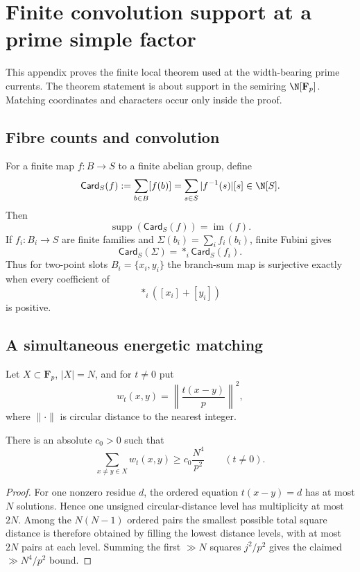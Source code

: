 \section{Finite convolution support at a prime simple factor}
\label{app:atomic-convolution}

This appendix proves the finite local theorem used at the width-bearing prime
currents.  The theorem statement is about support in the semiring
$\N[\mathbf F_p]$.  Matching coordinates and characters occur only inside the
proof.

\subsection{Fibre counts and convolution}

For a finite map $f:B\to S$ to a finite abelian group, define
\[
\mathsf{Card}_S(f)
:=\sum_{b\in B}[f(b)]
=\sum_{s\in S}|f^{-1}(s)|[s]
\in\N[S].
\]
Then
\[
\operatorname{supp}(\mathsf{Card}_S(f))=\operatorname{im}(f).
\tag{AC1}\label{eq:card-support}
\]
If $f_i:B_i\to S$ are finite families and
$\Sigma(b_i)=\sum_i f_i(b_i)$, finite Fubini gives
\[
\mathsf{Card}_S(\Sigma)=*_{i}\mathsf{Card}_S(f_i).
\tag{AC2}\label{eq:fubini-convolution}
\]
Thus for two-point slots $B_i=\{x_i,y_i\}$ the branch-sum map is surjective
exactly when every coefficient of
\[
*_{i}([x_i]+[y_i])
\]
is positive.

\subsection{A simultaneous energetic matching}

Let $X\subset\mathbf F_p$, $|X|=N$, and for $t\ne0$ put
\[
w_t(x,y)=\left\|\frac{t(x-y)}p\right\|^2,
\]
where $\|\cdot\|$ is circular distance to the nearest integer.

\begin{lemma}\label{lem:difference-energy-shell}
There is an absolute $c_0>0$ such that
\[
\sum_{x\ne y\in X}w_t(x,y)
\ge c_0\frac{N^4}{p^2}
\qquad(t\ne0).
\]
\end{lemma}

\begin{proof}
For one nonzero residue $d$, the ordered equation $t(x-y)=d$ has at most $N$
solutions.  Hence one unsigned circular-distance level has multiplicity at
most $2N$.  Among the $N(N-1)$ ordered pairs the smallest possible total
square distance is therefore obtained by filling the lowest distance levels,
with at most $2N$ pairs at each level.  Summing the first $\gg N$ squares
$j^2/p^2$ gives the claimed $\gg N^4/p^2$ bound.
\end{proof}

